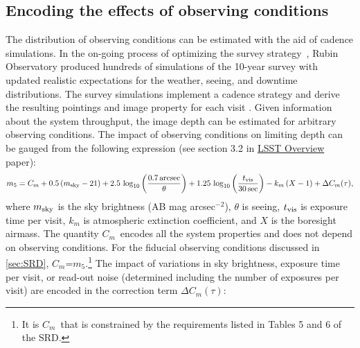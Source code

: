 \documentclass[PST,authoryear,toc]{lsstdoc}
\newcommand{\cm}{\ensuremath{C_m}}
\newcommand{\mf}{\ensuremath{m_5}}
\begin{document}
\subsection{Encoding the effects of observing conditions}\label{sec:Cm}

The distribution of observing conditions can be estimated with the aid of cadence simulations.  In the on-going process of optimizing the survey strategy~\citep{Bianco_2021}, Rubin Observatory produced hundreds of simulations of the 10-year survey with updated realistic expectations for the weather, seeing, and downtime distributions.  The survey simulations implement a cadence strategy and derive the resulting pointings and image property for each visit \citep{2019AJ....157..151N, 2016SPIE.9910E..13D, 2014SPIE.9150E..15D}. 
Given information about the system throughput, the image depth can be estimated for arbitrary observing conditions. The impact of observing conditions on limiting depth 
can be gauged from the following expression (see section 3.2 in
\href{https://ls.st/lop}{{LSST Overview}} paper): 
\begin{equation}
\label{eq:Cm}
m_5 = \cm + 0.5\,(m_{\rm sky} - 21) + 2.5\,\log_{10}\left(\frac{0.7 \, {\rm arcsec}}{\theta}\right) + 1.25\,\log_{10}\left(\frac{t_{\rm vis}}{ 30 \, {\rm sec}}\right) - k_m\,(X-1) + \Delta\cm(\tau),
\end{equation}
where $m_{\rm sky}$ is the sky brightness (AB mag arcsec$^{-2}$), $\theta$ is seeing, $t_{\rm vis}$ is exposure 
time per visit, $k_m$ is atmospheric extinction coefficient, and $X$ is the boresight airmass. 
The quantity \cm\ encodes all the system properties and does not depend on observing conditions.  For the fiducial observing conditions discussed in \autoref{sec:SRD}, \cm=\mf.\footnote{It is \cm\ that is constrained by the requirements listed in Tables 5 and 6 of the SRD.}
The impact of variations in sky brightness, exposure time per visit, or read-out noise (determined including the number 
of exposures per visit) are encoded in the correction term $\Delta C_m(\tau)$:
\end{document}
